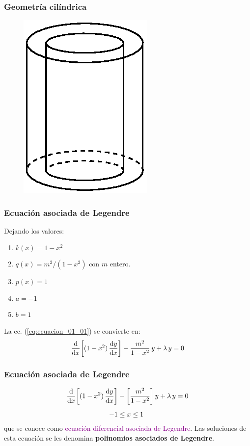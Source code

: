 \documentclass[12pt]{beamer}
\begin{document}
\begin{frame}
\frametitle{Geometría cilíndrica}
\begin{figure}
\centering
\includegraphics[scale=1.3]{Imagenes/cilindros_01.eps}
\end{figure}
\end{frame}
\begin{frame}
\frametitle{Ecuación asociada de Legendre}
Dejando los valores:
\pause
{}
\begin{multicols}{2}
\begin{enumerate}[<+->]
\item $k(x) = 1 - x^{2}$
\item $q(x) = m^{2}/(1 - x^{2})$ con $m$ entero.
\item $p(x) = 1$
\item $a = -1$
\item $b = 1$
\end{enumerate}
\end{multicols}
\pause
La ec. (\ref{eq:ecuacion_01_01}) se convierte en:
\begin{align}
\dv{x} \bigg[ (1 - x^{2}) \, \dv{y}{x} \bigg] - \dfrac{m^{2}}{1 - x^{2}} \, y + \lambda \, y = 0
\label{eq:ecuacion_01_06}
\end{align}
\end{frame}
\begin{frame}
\frametitle{Ecuación asociada de Legendre}
\begin{align*}
\dv{x} \bigg[ (1 - x^{2}) \, \dv{y}{x} \bigg] &- \bigg[ \dfrac{m^{2}}{1 - x^{2}} \bigg] \, y + \lambda \, y = 0 \\[0.5em]
-1 &\leq x \leq 1
\end{align*}
\pause
que se conoce como \textcolor{darkmagenta}{ecuación diferencial asociada de Legendre}. \pause Las soluciones de esta ecuación se les denomina \textbf{\textcolor{darkpastelred}{polinomios asociados de Legendre}}.
\end{frame}
\end{document}
